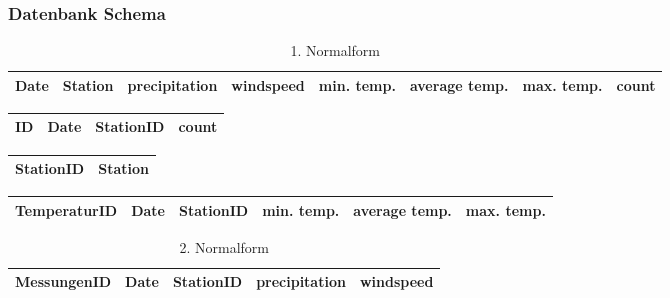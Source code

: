 \documentclass{article}
\begin{document}
\subsubsection{Datenbank Schema} 
\begin{table}[H]
    \centering
    \begin{tabular}{|c|c|c|c|c|c|c|c|}
        \hline
        Date & Station & precipitation & windspeed & min. temp. & average temp. & max. temp. & count \\
    \hline
    \end{tabular}
    \caption{1. Normalform}
    \label{tab:my_label}
\end{table}
\begin{table}[H]
    \centering
    \begin{tabular}{|c|c|c|c|}
    \hline
ID & Date & StationID & count \\
    \hline      
    \end{tabular}
\end{table}
\begin{table}[H]
    \centering
    \begin{tabular}{|c|c|}
    \hline
StationID & Station  \\
\hline
    \end{tabular}
\end{table}
\begin{table}[H]
    \centering
    \begin{tabular}{|c|c|c|c|c|c|}
    \hline
TemperaturID & Date & StationID & min. temp. & average temp. & max. temp. \\
\hline
    \end{tabular}
\end{table}
\begin{table}[H]
    \centering
    \begin{tabular}{|c|c|c|c|c|}
    \hline
MessungenID & Date & StationID & precipitation & windspeed  \\
    \hline
    \end{tabular}
    \caption{2. Normalform}
\end{table}
\end{document}
